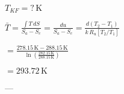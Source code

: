 \( T_{KF} = ? \, \text{K} \)  

\( \bar{T} = \frac{\int T \, dS}{S_a - S_e} = \frac{du}{S_a - S_e} = \frac{d \left( T_2 - T_1 \right)}{k \, R_u \left[ T_2 / T_1 \right]} \)  

\( = \frac{278.15 \, \text{K} - 288.15 \, \text{K}}{\ln \left( \frac{282.15 \, \text{K}}{288.15 \, \text{K}} \right)} \)  

\( = 293.72 \, \text{K} \)  

---